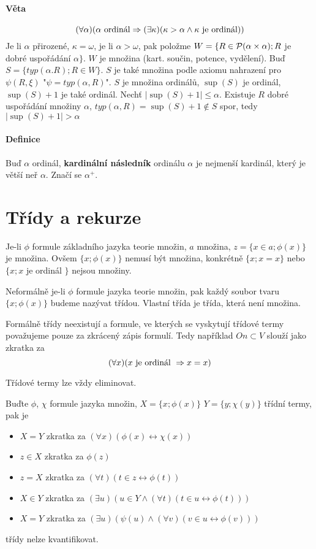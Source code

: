 \documentclass[a4paper,12pt,titlepage]{article}
\begin{document}
\paragraph{Věta}
$$
(\forall \alpha)(\alpha \text{ ordinál} \Rightarrow (\exists \kappa)(\kappa > \alpha \land
	\kappa \text{ je ordinál}))
$$
Je li $\alpha$ přirozené, $\kappa = \omega$,   
je li $\alpha > \omega$, pak položme $W = \{R \in \mathcal{P}(\alpha \times \alpha);
R $ je dobré uspořádání $\alpha\}$. $W$ je množina (kart. součin, potence, vydělení).
Buď $S = \{ typ( \alpha. R); R \in W \}$. $S$ je také množina podle axiomu nahrazení pro
$\psi(R,\xi)$ "$\psi = typ(\alpha, R)$". $S$ je množina ordinálů, $\sup(S)$ je ordinál,
$\sup(S) + 1$ je také ordinál. Nechť $|\sup(S) + 1| \le \alpha$. Existuje $R$ dobré
uspořádání množiny $\alpha$, $typ(\alpha, R) = \sup(S) + 1 \nin S$ spor, tedy 
$|\sup(S) + 1 | > \alpha$

\paragraph{Definice}
Buď $\alpha$ ordinál, \textbf{kardinální následník} ordinálu $\alpha$ je nejmenší
kardinál, který je větší neř $\alpha$. Značí se $\alpha^+$.

\section{Třídy a rekurze}

Je-li $\phi$ formule základního jazyka teorie množin, $a$ množina, $z = \{ x \in a; \phi(x)\}$
je množina. Ovšem $\{x; \phi(x)\}$ nemusí být množina, konkrétně $\{ x; x = x \}$ nebo
$\{x; x $ je ordinál $\}$ nejsou množiny.

Neformálně je-li $\phi$ formule jazyka teorie množin, pak každý soubor tvaru $\{ x; \phi(x) \}$
budeme nazývat třídou. Vlastní třída je třída, která není množina.

Formálně třídy neexistují a formule, ve kterých se vyskytují třídové termy považujeme pouze
za zkrácený zápis formulí. Tedy například $On \subset V$ slouží jako zkratka za 
$$
	(\forall x)(x \text{ je ordinál } \Rightarrow x = x)
$$

Třídové termy lze vždy eliminovat. 

Buďte $\phi$, $\chi$ formule jazyka množin, $X = \{x; \phi(x)\}$  $Y = \{y; \chi(y)\}$ třídní
termy, pak je 
\begin{itemize}
	\item $X = Y$ zkratka za $(\forall x) (\phi(x) \leftrightarrow \chi(x))$
	\item $z \in X$ zkratka za $\phi(z)$
	\item $z = X$ zkratka za $(\forall t)( t \in z \leftrightarrow \phi(t))$
	\item $X \in Y$ zkratka za $(\exists u)( u \in Y \land (\forall t)(t \in u \leftrightarrow
		 \phi(t)))$
	\item $X = Y$ zkratka za $(\exists u)( \psi(u) \land (\forall v)(v \in u \leftrightarrow
		 \phi(v)))$
\end{itemize}
třídy nelze kvantifikovat. 
\end{document}
